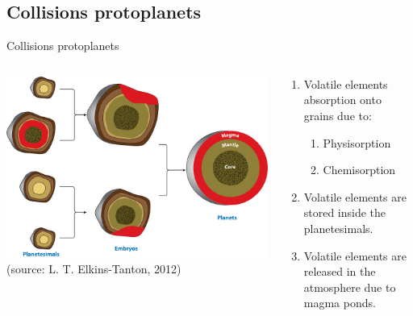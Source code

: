 \documentclass[11pt, aspectratio=169]{beamer}
\begin{document}
\subsection{Collisions protoplanets}
\begin{frame}[t]{Collisions protoplanets}
	\begin{columns}
	\begin{column}{0.5\textwidth}
		\centering
		\vspace{-1cm}
     	\includegraphics[height=.73\textheight]{figures/protoplanets.png} \\
     	\small (source: L. T. Elkins-Tanton, 2012)
	\end{column}
	\begin{column}{0.5\textwidth}
	\begin{enumerate}
		\item Volatile elements absorption onto grains due to:
		\begin{enumerate}
			\item Physisorption\\
			\item Chemisorption\\
		\end{enumerate}
		\item Volatile elements are stored inside the planetesimals.\\
		\item Volatile elements are released in the atmosphere due to magma ponds.\\
	\end{enumerate}
	\vspace{3cm}
	\end{column}
	\end{columns}	
\end{frame}
\end{document}
